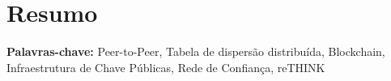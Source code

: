 \chapter*{Resumo}



\vspace{1cm}

\textbf{\Large Palavras-chave:} Peer-to-Peer, Tabela de dispersão distribuída, Blockchain, Infraestrutura de Chave Públicas, Rede de Confiança, reTHINK

\cleardoublepage

